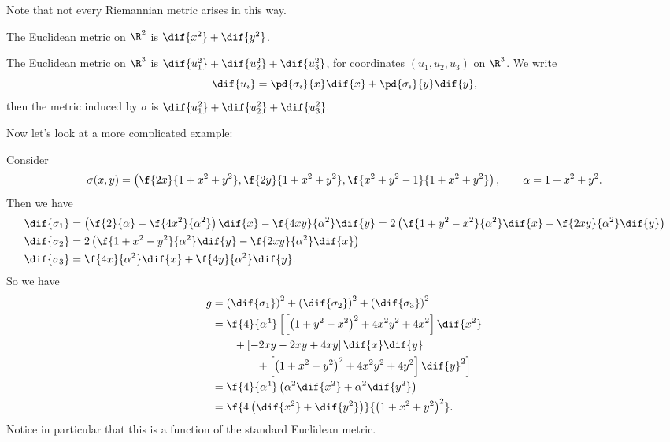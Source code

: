 Note that not every Riemannian metric arises in this way.

	\pagebreak

\begin{example}
	The Euclidean metric on $\R^2$ is $\dif{x^2}+\dif{y^2}$.

	The Euclidean metric on $\R^3$ is $\dif{u_1^2} + \dif{u_2^2} + \dif{u_3^2}$, for coordinates $(u_1,u_2,u_3)$ on $\R^3$. We write
	\begin{equation*}
		\dif{u_i} = \pd{\sigma_i}{x} \dif{x} + \pd{\sigma_i}{y} \dif{y},
	\end{equation*}
	then the metric induced by $\sigma$ is $\dif{u_1^2} + \dif{u_2^2} + \dif{u_3^2}$.
\end{example}

Now let's look at a more complicated example:

\begin{example}
	Consider
	\begin{equation*}
		\sigma(x,y) = \left( \f{2x}{1+x^2+y^2}, \f{2y}{1+x^2+y^2}, \f{x^2+y^2-1}{1+x^2+y^2} \right), \qquad \alpha=1+x^2+y^2.
	\end{equation*}
	Then we have
	\begin{align*}
		\dif{\sigma_1}
		&= \left( \f{2}{\alpha} - \f{4x^2}{\alpha^2} \right) \dif{x} - \f{4xy}{\alpha^2} \dif{y}
		 = 2 \left( \f{1+y^2-x^2}{\alpha^2} \dif{x} - \f{2xy}{\alpha^2} \dif{y} \right) \\
		\dif{\sigma_2}
		&= 2 \left( \f{1+x^2-y^2}{\alpha^2} \dif{y} - \f{2xy}{\alpha^2} \dif{x} \right) \\
		\dif{\sigma_3}
		&= \f{4x}{\alpha^2} \dif{x} + \f{4y}{\alpha^2} \dif{y}.
	\end{align*}
	So we have
	\begin{align*}
		g
		&= \left( \dif{\sigma_1} \right)^2 + \left( \dif{\sigma_2} \right)^2 + \left( \dif{\sigma_3} \right)^2 \\
		&= \f{4}{\alpha^4} \left[ \left[ \left( 1+y^2-x^2 \right)^2 + 4x^2 y^2 + 4x^2 \right] \dif{x^2} \right. \\
		&  \qquad + \left[ -2xy-2xy+4xy \right] \dif{x} \dif{y} \\
		&  \qquad\qquad \left.+ \left[ \left( 1+x^2 - y^2 \right)^2 + 4x^2 y^2 + 4y^2 \right] \dif{y}^2 \right] \\
		&= \f{4}{\alpha^4} \left( \alpha^2 \dif{x^2} + \alpha^2 \dif{y^2} \right) \\
		&= \f{4\left( \dif{x^2} + \dif{y^2} \right)}{\left( 1+x^2+y^2 \right)^2}.
	\end{align*}
	Notice in particular that this is a function of the standard Euclidean metric.
\end{example}

